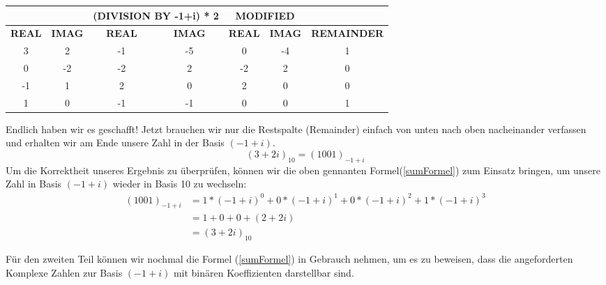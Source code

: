 \documentclass[course=erap]{aspdoc}
\begin{document}
\begin{table}[!ht]
\centering
\begin{tabular}{|c|c|cc|cc|c|}
\hline
              &               & \multicolumn{2}{c|}{\textbf{(DIVISION BY -1+i) * 2}} & \multicolumn{2}{c|}{\textbf{MODIFIED}}             &                    \\ \hline
\textbf{REAL} & \textbf{IMAG} & \multicolumn{1}{c|}{\textbf{REAL}}  & \textbf{IMAG}  & \multicolumn{1}{c|}{\textbf{REAL}} & \textbf{IMAG} & \textbf{REMAINDER} \\ \hline
3             & 2             & \multicolumn{1}{c|}{-1}             & -5             & \multicolumn{1}{c|}{0}             & -4            & 1                  \\ \hline
0             & -2            & \multicolumn{1}{c|}{-2}             & 2              & \multicolumn{1}{c|}{-2}            & 2             & 0                  \\ \hline
-1            & 1             & \multicolumn{1}{c|}{2}              & 0              & \multicolumn{1}{c|}{2}             & 0             & 0                  \\ \hline
1             & 0             & \multicolumn{1}{c|}{-1}             & -1             & \multicolumn{1}{c|}{0}             & 0             & 1                  \\ \hline
\end{tabular}
\end{table}

Endlich haben wir es geschafft! Jetzt brauchen wir nur die Restspalte (Remainder) einfach von unten nach oben nacheinander verfassen und erhalten wir am Ende unsere Zahl in der Basis $(-1+i)$.
\[(3 + 2i)_{10} = (1001)_{-1+i}\]
\newline
Um die Korrektheit unseres Ergebnis zu überprüfen, können wir die oben gennanten Formel(\ref{sumFormel}) zum Einsatz bringen, um unsere Zahl in Basis $(-1+i)$ wieder in Basis 10 zu wechseln:
\begin{equation*}
    \begin{split}
        (1001)_{-1+i} &= 1*(-1+i)^0 + 0*(-1+i)^1 + 0*(-1+i)^2 +1*(-1+i)^3 \\
        &=1 + 0 + 0 + (2 + 2i) \\
        &= (3+2i)_{10}
    \end{split}   
\end{equation*}

Für den zweiten Teil können wir nochmal die Formel (\ref{sumFormel}) in Gebrauch nehmen, um es zu beweisen, dass die angeforderten Komplexe Zahlen zur Basis $(-1+i)$ mit binären Koeffizienten darstellbar sind.
\end{document}

